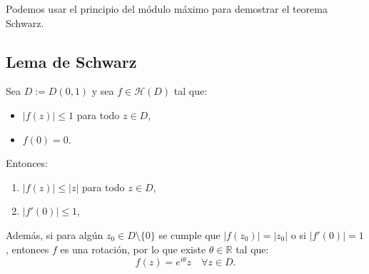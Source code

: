 Podemos usar el principio del módulo máximo para demostrar el teorema Schwarz.

\subsection{Lema de Schwarz}

\begin{lema} 
    Sea $D := D(0,1)$ y sea $f \in \mathcal{H}(D)$ tal que:
    \begin{itemize}
        \item $|f(z)| \leq 1$ para todo $z \in D$,
        \item $f(0) = 0$.
    \end{itemize}
    Entonces:
    \begin{enumerate}
        \item $|f(z)| \leq |z|$ para todo $z \in D$,
        \item $|f'(0)| \leq 1$,
    \end{enumerate}
    Además, si para algún $z_0 \in D \setminus \{0\}$ se cumple que $|f(z_0)| = |z_0|$ o si $|f'(0)| = 1$, entonces $f$ es una rotación, por lo que existe $\theta \in \mathbb{R}$ tal que:
    \[
        f(z) = e^{i \theta} z \quad \forall z \in D.
    \]
\end{lema}

